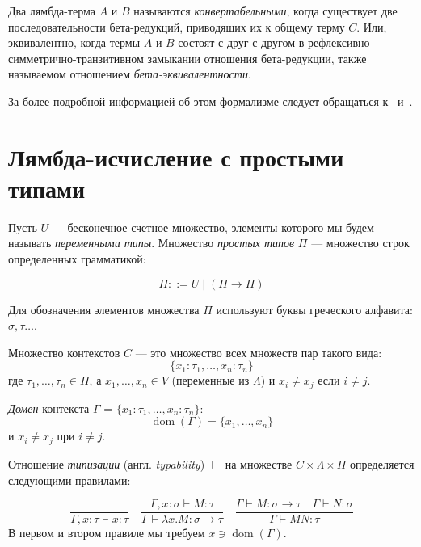 Два лямбда-терма $A$ и $B$ называются \emph{конвертабельными},
когда существует две последовательности бета-редукций, приводящих их к общему терму $C$.
Или, эквивалентно, когда термы $A$ и $B$ состоят с друг с другом в рефлексивно-симметрично-транзитивном замыкании отношения бета-редукции, также называемом отношением \emph{бета-эквивалентности}.

За более подробной информацией об этом формализме следует обращаться к~\cite{TTFP} и~\cite{Sorensen}.

\section{Лямбда-исчисление с простыми типами}
\begin{definition}
    Пусть $U$ — бесконечное счетное множество, элементы которого мы будем
    называть \emph{переменными типы}.
    Множество \emph{простых типов} $\Pi$ — множество строк определенных грамматикой:

    $$ \Pi ::= U \mid (\Pi \to \Pi) $$

    Для обозначения элементов множества $\Pi$ используют буквы греческого алфавита:
    $\sigma, \tau \ldots $.
\end{definition}
\begin{definition}
    Множество контекстов $C$ — это множество всех множеств пар такого вида:
    $$ \{ x_1 : \tau_1 , \ldots , x_n : \tau_n \} $$
    где $ \tau_1 , \ldots , \tau_n \in \Pi$, а
    $ x_1 , \ldots , x_n \in V $ (переменные из $\Lambda$) и $x_i \neq x_j$ если $i \neq j$.
\end{definition}
\begin{definition}
    \emph{Домен} контекста $\Gamma$ = $ \{ x_1 : \tau_1 , \ldots , x_n : \tau_n \} $:
    $$ \operatorname{dom} (\Gamma) = \{ x_1 , \ldots , x_n \} $$ и $x_i \neq x_j$ при $i \neq j$.
\end{definition}
\begin{definition}
    Отношение \emph{типизации} (англ. \emph{typability}) $ \vdash $ на множестве
    $ C \times \Lambda \times \Pi $ определяется следующими правилами:

    $$ \frac {} {\Gamma, x : \tau \vdash x : \tau}
    \quad
    \frac{\Gamma, x : \sigma \vdash M : \tau}
    {\Gamma \vdash \lambda x . M : \sigma \to \tau}
    \quad
    \frac{\Gamma \vdash M : \sigma \to \tau \quad \Gamma \vdash N : \sigma}
    {\Gamma \vdash M N : \tau}
    $$
    В первом и втором правиле мы требуем $x \ni \operatorname{dom}(\Gamma).$
\end{definition}
